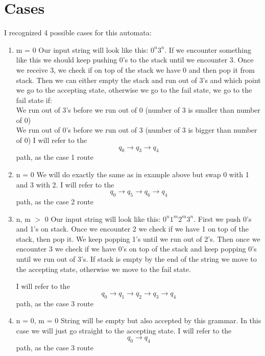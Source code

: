 \documentclass{report}[pt12]
\begin{document}
\section{Cases}
I recognized 4 possible cases for this automata:
\begin{enumerate}
\item m = 0
Our input string will look like this: $0^n3^n$. If we encounter something like this we should keep pushing 0's to the stack until we encounter 3. Once we receive 3, we check if on top of the stack we have 0 and then pop it from stack. Then we can either empty the stack and run out of 3's and which point we go to the accepting state, otherwise we go to the fail state, we go to the fail state if:
\\ We run out of 3's before we run out of 0 (number of 3 is smaller than number of 0)
\\ We run out of 0's before we run out of 3 (number of 3 is bigger than number of 0)
I will refer to the
\[ q_0 \rightarrow q_3 \rightarrow q_4 \]
path, as the case 1 route
\item n = 0
We will do exactly the same as in example above but swap 0 with 1 and 3 with 2.
I will refer to the
\[ q_0 \rightarrow q_5 \rightarrow q_6 \rightarrow q_4 \]
path, as the case 2 route
\item n, m $>$ 0
Our input string will look like this: $0^n1^m2^m3^n$.
First we push 0's and 1's on stack. Once we encounter 2 we check if we have 1 on top of the stack, then pop it. We keep popping 1's until we run out of 2's. Then once we encounter 3 we check if we have 0's on top of the stack and keep popping 0's until we run out of 3's. If stack is empty by the end of the string we move to the accepting state, otherwise we move to the fail state.

I will refer to the
\[ q_0 \rightarrow q_1 \rightarrow q_2 \rightarrow q_3 \rightarrow q_4 \]
path, as the case 3 route
\item n = 0, m = 0
String will be empty but also accepted by this grammar. In this case we will just go straight to the accepting state.
I will refer to the
\[ q_0 \rightarrow q_4 \]
path, as the case 3 route
\end{enumerate}
\end{document}
